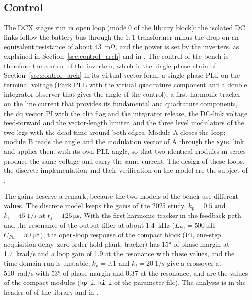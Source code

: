 \documentclass[12pt,a4paper]{scrartcl}
\begin{document}
\begin{onehalfspace}
\subsection{Control}
\label{sec:bench2026_ctrl}
The DCX stages run in open loop (mode 0 of the library block): the isolated DC links follow the battery bus through the $1:1$ transformer minus the drop on an equivalent resistance of about \SI{43}{\milli\ohm}, and the power is set by the inverters, as explained in Section~\ref{sec:control_arch} and in \cite{cllc_dcx_doc}. The control of the bench is therefore the control of the inverters, which is the single phase chain of Section~\ref{sec:control_arch} in its virtual vector form: a single phase PLL on the terminal voltage (Park PLL with the virtual quadrature component and a double integrator observer that gives the angle of the control), a first harmonic tracker on the line current that provides its fundamental and quadrature components, the dq vector PI with the clip flag and the integrator release, the DC-link voltage feed-forward and the vector-length limiter, and the three level modulators of the two legs with the dead time around both edges. Module A closes the loop; module B reads the angle and the modulation vector of A through the \texttt{sync} link and applies them with its own PLL angle, so that two identical modules in series produce the same voltage and carry the same current. The design of these loops, the discrete implementation and their verification on the model are the subject of \cite{spinv_doc}.

The gains deserve a remark, because the two models of the bench use different values. The discrete model keeps the gains of the 2025 study, $k_p = 0.5$ and $k_i = \SI{45}{1/s}$ at $t_s = \SI{125}{\micro\second}$. With the first harmonic tracker in the feedback path and the resonance of the output filter at about \SI{1.4}{\kilo\hertz} ($L_{Fu} = \SI{500}{\micro\henry}$, $C_{Fu} = \SI{50}{\micro\farad}$), the open-loop response of the compact block (PI, one-step acquisition delay, zero-order-hold plant, tracker) has \ang{15} of phase margin at \SI{1.7}{krad/s} and a loop gain of \num{1.9} at the resonance with these values, and the time-domain run is unstable; $k_p = 0.1$ and $k_i = \SI{20}{1/s}$ give a crossover at \SI{510}{rad/s} with \ang{53} of phase margin and \num{0.37} at the resonance, and are the values of the compact modules (\texttt{kp\_i}, \texttt{ki\_i} of the parameter file). The analysis is in the header of  of the library and in \cite{spinv_doc}.


\end{onehalfspace}
\end{document}
